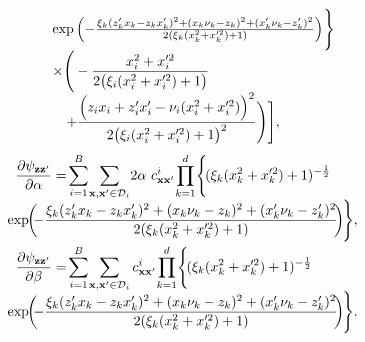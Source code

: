 \documentclass[conference]{IEEEtran}
\begin{document}
\begin{equation*}
\begin{array}{l}
			\quad\exp\left(-\frac{\xi_k(z^\prime_{k}x_{k}-z_{k}x^\prime_{k})^2+(x_{k}\nu_k-z_{k})^2+(x^\prime_{k}\nu_k-z^\prime_{k})^2}{2(\xi_k(x_{k}^2+x_{k}^{\prime 2})+1)}\right)\hspace{-0.5mm}\Bigg\}\\
			\quad\times\Bigg(-\dfrac{x_{i}^2+x_{i}^{\prime2}}{2\big(\xi_i(x_{i}^2+x_{i}^{\prime2})+1\big)}\\
			\qquad+\dfrac{\Big(z_{i}x_{i}+z_{i}^\prime x_{i}^\prime-\nu_i(x_{i}^2+x_{i}^{\prime2})\Big)^2}{2\big(\xi_i(x_{i}^2+x_{i}^{\prime2})+1\big)^2}\Bigg)\Biggr],
		\end{array}
	\end{equation*}
	\begin{equation*}
	\begin{array}{l}
	\displaystyle\dfrac{\partial\psi_\mathbf{zz^\prime}}{\partial \alpha}=\hspace{-0.5mm}\sum\limits_{i=1}^{B}\hspace{-0.5mm}\sum\limits_{\mathbf{x},\mathbf{x}^\prime\in\mathcal{D}_i}\hspace{-0.5mm}2\alpha\ c^{i}_{\mathbf{x}\mathbf{x}^\prime}\hspace{-0.5mm}\prod_{k=1}^{d}\hspace{-0.5mm}\Bigg\{\hspace{-0.5mm}(\xi_k(x_{k}^2+x_{k}^{\prime2})+1)^{-\frac{1}{2}} \\
	\displaystyle \hspace{-2mm}\exp\hspace{-1mm}\left(\hspace{-1mm}-\frac{\xi_k(z^\prime_{k}x_{k}-z_{k}x^\prime_{k})^2+(x_{k}\nu_k-z_{k})^2+(x^\prime_{k}\nu_k-z^\prime_{k})^2}{2(\xi_k(x_{k}^2+x_{k}^{\prime 2})+1)}\hspace{-1mm}\right)\hspace{-1mm}\Bigg\},\vspace{1mm}\\
	\displaystyle\dfrac{\partial\psi_\mathbf{zz^\prime}}{\partial \beta}=\hspace{-0.5mm}\sum\limits_{i=1}^{B}\hspace{-0.5mm}\sum\limits_{\mathbf{x},\mathbf{x}^\prime\in\mathcal{D}_i} c^{i}_{\mathbf{x}\mathbf{x}^\prime}\hspace{-0.5mm}\prod_{k=1}^{d}\hspace{-0.5mm}\Bigg\{\hspace{-0.5mm}(\xi_k(x_{k}^2+x_{k}^{\prime2})+1)^{-\frac{1}{2}}\\
	\displaystyle\hspace{-2mm}\exp\hspace{-1mm}\left(\hspace{-1mm}-\frac{\xi_k(z^\prime_{k}x_{k}-z_{k}x^\prime_{k})^2+(x_{k}\nu_k-z_{k})^2+(x^\prime_{k}\nu_k-z^\prime_{k})^2}{2(\xi_k(x_{k}^2+x_{k}^{\prime 2})+1)}\hspace{-1mm}\right)\hspace{-1mm}\Bigg\}.
	\end{array}
	\end{equation*}
\end{document}
